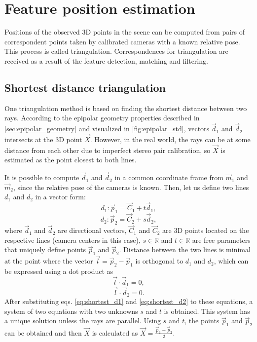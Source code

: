 \section{Feature position estimation}
Positions of the observed 3D points in the scene can be computed from pairs of correspondent points taken by calibrated cameras with a known relative pose.
This process is called triangulation.
Correspondences for triangulation are received as a result of the feature detection, matching and filtering.

\subsection{Shortest distance triangulation}
\label{sec:shortest_distance}
One triangulation method is based on finding the shortest distance between two rays.
According to the epipolar geometry properties described in \autoref{sec:epipolar_geometry} and visualized in \autoref{fig:epipolar_std}, vectors $\vec{d}_1$ and $\vec{d}_2$ intersects at the 3D point $\vec{X}$.
However, in the real world, the rays can be at some distance from each other due to imperfect stereo pair calibration, so $\vec{X}$ is estimated as the point closest to both lines.

It is possible to compute $\vec{d}_1$ and $\vec{d}_2$ in a common coordinate frame from $\vec{m}_1$ and $\vec{m}_2$, since the relative pose of the cameras is known.
Then, let us define two lines $d_1$ and $d_2$ in a vector form:
\begin{equation}
    \label{eq:shortest_d1}
    d_1: \vec{p}_1 = \vec{C}_1 + t \vec{d}_1,
\end{equation}
\begin{equation}
    \label{eq:shortest_d2}
    d_2: \vec{p}_2 = \vec{C}_2 + s \vec{d}_2,
\end{equation}
where $\vec{d}_1$ and $\vec{d}_2$ are directional vectors, $\vec{C}_1$ and $\vec{C}_2$ are 3D points located on the respective lines (camera centers in this case), $s \in \mathbb{R}$ and $t \in \mathbb{R}$ are free parameters that uniquely define points $\vec{p}_1$ and $\vec{p}_2$. 
Distance between the two lines is minimal at the point where the vector $\vec{l} = \vec{p}_2 - \vec{p}_1$ is orthogonal to $d_1$ and $d_2$, which can be expressed using a dot product as 
\begin{equation}
    \label{eq:ldd1}
    \vec{l} \cdot \vec{d}_1 = 0,
\end{equation}
\begin{equation}
    \label{eq:ldd2}
    \vec{l} \cdot \vec{d}_2 = 0.
\end{equation}
After substituting eqs. \eqref{eq:shortest_d1} and \eqref{eq:shortest_d2} to these equations, a system of two equations with two unknowns $s$ and $t$ is obtained.
This system has a unique solution unless the rays are parallel.
Using $s$ and $t$, the points $\vec{p}_1$ and $\vec{p}_2$ can be obtained and then $\vec{X}$ is calculated as $\vec{X} = \frac{\vec{p}_1 + \vec{p}_2}{2}$.

